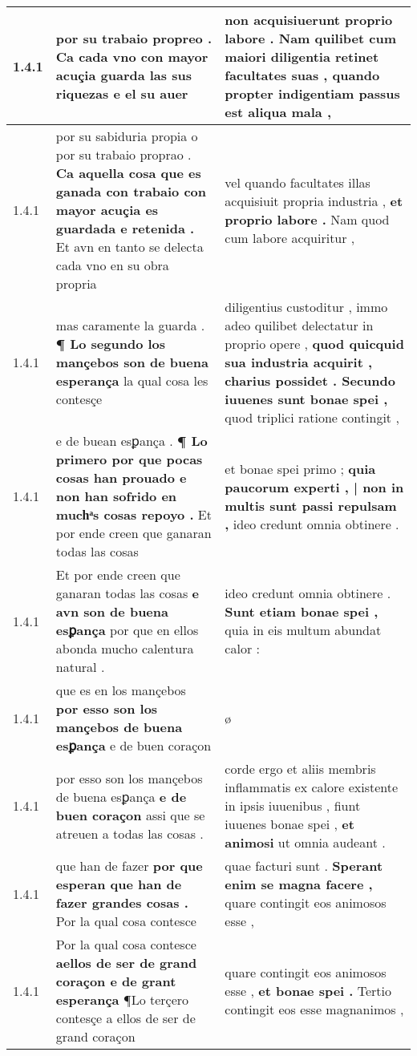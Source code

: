 \begin{tabular}{|p{1cm}|p{6.5cm}|p{6.5cm}|}
1.4.1 & por su trabaio propreo . \textbf{ Ca cada vno con mayor acuçia guarda las sus riquezas } e el su auer & non acquisiuerunt proprio labore . \textbf{ Nam quilibet cum maiori diligentia retinet facultates suas , } quando propter indigentiam passus est aliqua mala , \\\hline
1.4.1 & por su sabiduria propia o por su trabaio proprao . \textbf{ Ca aquella cosa que es ganada con trabaio con mayor acuçia es guardada e retenida . } Et avn en tanto se delecta cada vno en su obra propria & vel quando facultates illas acquisiuit propria industria , \textbf{ et proprio labore . } Nam quod cum labore acquiritur , \\\hline
1.4.1 & mas caramente la guarda . \textbf{ ¶ Lo segundo los mançebos son de buena esperança } la qual cosa les contesçe & diligentius custoditur , immo adeo quilibet delectatur in proprio opere , \textbf{ quod quicquid sua industria acquirit , charius possidet . Secundo iuuenes sunt bonae spei , } quod triplici ratione contingit , \\\hline
1.4.1 & e de buean esꝑança . \textbf{ ¶ Lo primero por que pocas cosas han prouado e non han sofrido en muchͣs cosas repoyo . } Et por ende creen que ganaran todas las cosas & et bonae spei primo ; \textbf{ quia paucorum experti , | non in multis sunt passi repulsam , } ideo credunt omnia obtinere . \\\hline
1.4.1 & Et por ende creen que ganaran todas las cosas \textbf{ e avn son de buena esꝑança } por que en ellos abonda mucho calentura natural . & ideo credunt omnia obtinere . \textbf{ Sunt etiam bonae spei , } quia in eis multum abundat calor : \\\hline
1.4.1 & que es en los mançebos \textbf{ por esso son los mançebos de buena esꝑança } e de buen coraçon & ø \\\hline
1.4.1 & por esso son los mançebos de buena esꝑança \textbf{ e de buen coraçon } assi que se atreuen a todas las cosas . & corde ergo et aliis membris inflammatis ex calore existente in ipsis iuuenibus , fiunt iuuenes bonae spei , \textbf{ et animosi } ut omnia audeant . \\\hline
1.4.1 & que han de fazer \textbf{ por que esperan que han de fazer grandes cosas . } Por la qual cosa contesce & quae facturi sunt . \textbf{ Sperant enim se magna facere , } quare contingit eos animosos esse , \\\hline
1.4.1 & Por la qual cosa contesce \textbf{ aellos de ser de grand coraçon e de grant esperança } ¶Lo terçero contesçe a ellos de ser de grand coraçon & quare contingit eos animosos esse , \textbf{ et bonae spei . } Tertio contingit eos esse magnanimos , \\\hline

\end{tabular}
